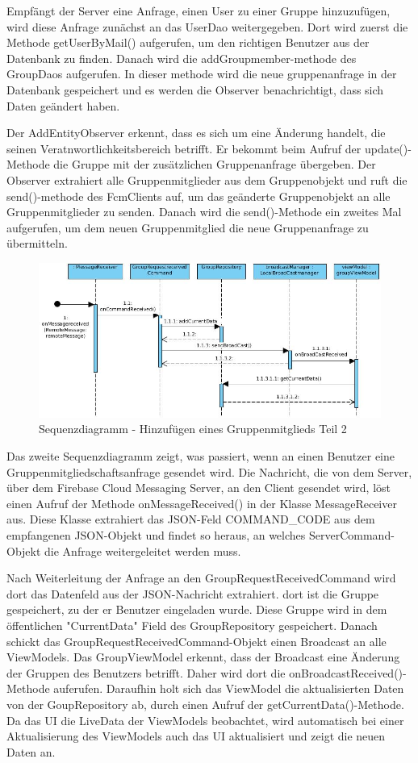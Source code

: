 \documentclass[parskip=full]{scrartcl}
\begin{document}
Empfängt der Server eine Anfrage, einen User zu einer Gruppe hinzuzufügen, wird diese Anfrage zunächst an das UserDao weitergegeben. Dort wird zuerst die Methode getUserByMail() aufgerufen, um den richtigen Benutzer aus der Datenbank zu finden. Danach wird die addGroupmember-methode des GroupDaos aufgerufen. In dieser methode wird die neue gruppenanfrage in der Datenbank gespeichert und es werden die Observer benachrichtigt, dass sich Daten geändert haben.

Der AddEntityObserver erkennt, dass es sich um eine Änderung handelt, die seinen Veratnwortlichkeitsbereich betrifft. Er bekommt beim Aufruf der update()-Methode die Gruppe mit der zusätzlichen Gruppenanfrage übergeben. Der Observer extrahiert alle Gruppenmitglieder aus dem Gruppenobjekt und ruft die send()-methode des FcmClients auf, um das geänderte Gruppenobjekt an alle Gruppenmitglieder zu senden. Danach wird die send()-Methode ein zweites Mal aufgerufen, um dem neuen Gruppenmitglied die neue Gruppenanfrage zu übermitteln.

\begin{figure}[H]
	\centering
	\includegraphics[width=1\textwidth]{../Sequenzdiagramme/addMember2.jpg}
	\caption{Sequenzdiagramm - Hinzufügen eines Gruppenmitglieds Teil 2}
\end{figure}

Das zweite Sequenzdiagramm zeigt, was passiert, wenn an einen Benutzer eine Gruppenmitgliedschaftsanfrage gesendet wird. Die Nachricht, die von dem Server, über dem Firebase Cloud Messaging Server, an den Client gesendet wird, löst einen Aufruf der Methode onMessageReceived() in der Klasse MessageReceiver aus. Diese Klasse extrahiert das JSON-Feld COMMAND\_CODE aus dem empfangenen JSON-Objekt und findet so heraus, an welches ServerCommand-Objekt die Anfrage weitergeleitet werden muss.

Nach Weiterleitung der Anfrage an den GroupRequestReceivedCommand wird dort das Datenfeld aus der JSON-Nachricht extrahiert. dort ist die Gruppe gespeichert, zu der er Benutzer eingeladen wurde. Diese Gruppe wird in dem öffentlichen "CurrentData" Field des GroupRepository gespeichert. Danach schickt das GroupRequestReceivedCommand-Objekt einen Broadcast an alle ViewModels. Das GroupViewModel erkennt, dass der Broadcast eine Änderung der Gruppen des Benutzers betrifft. Daher wird dort die onBroadcastReceived()-Methode auferufen. Daraufhin holt sich das ViewModel die aktualisierten Daten von der GoupRepository ab, durch einen Aufruf der getCurrentData()-Methode. Da das UI die LiveData der ViewModels beobachtet, wird automatisch bei einer Aktualisierung des ViewModels auch das UI aktualisiert und zeigt die neuen Daten an.
\end{document}
